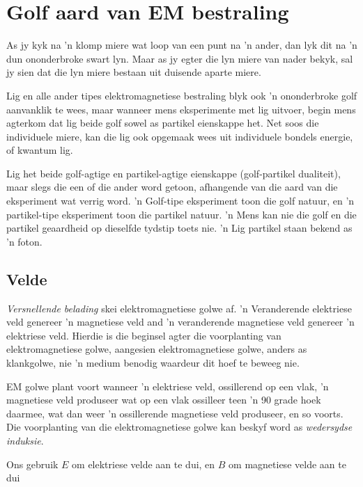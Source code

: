     \label{m38777*cid3}
            \section{Golf aard van EM bestraling}
            \nopagebreak
      \label{m38777*id186686}As jy kyk na 'n klomp miere wat loop van een punt na 'n ander, dan lyk dit na 'n dun ononderbroke swart lyn. Maar as jy egter die lyn miere van nader bekyk, sal jy sien dat die lyn miere bestaan uit duisende aparte miere.\par 
      \label{m38777*id187029}Lig en alle ander tipes elektromagnetiese bestraling blyk ook 'n ononderbroke golf aanvanklik te wees, maar wanneer mens eksperimente met lig uitvoer, begin mens agterkom dat lig beide golf sowel as partikel eienskappe het. Net soos die individuele miere, kan die lig ook opgemaak wees uit individuele bondels energie, of kwantum lig.\par 
      \label{m38777*id187035}Lig het beide golf-agtige en partikel-agtige eienskappe (golf-partikel dualiteit), maar slegs die een of die ander word getoon, afhangende van die aard van die eksperiment wat verrig word. 'n Golf-tipe eksperiment toon die golf natuur, en 'n partikel-tipe eksperiment toon die partikel natuur. 'n Mens kan nie die golf en die partikel geaardheid op dieselfde tydstip toets nie. 'n Lig partikel staan bekend as 'n foton.\par 







\subsection*{Velde}
            \nopagebreak
      \label{m38777*id187125}\textit{Versnellende belading} skei elektromagnetiese golwe af. 'n Veranderende elektriese veld genereer 'n magnetiese veld and 'n veranderende magnetiese veld genereer 'n elektriese veld. Hierdie is die beginsel agter die voorplanting van elektromagnetiese golwe, aangesien elektromagnetiese golwe, anders as klankgolwe, nie 'n medium benodig waardeur dit hoef te beweeg nie.  


EM golwe plant voort wanneer 'n elektriese veld, ossillerend op een vlak, 'n magnetiese veld produseer wat op een vlak ossilleer teen 'n 90 grade hoek daarmee, wat dan weer 'n ossillerende magnetiese veld produseer, en so voorts.   Die voorplanting van die elektromagnetiese golwe kan beskyf word as \textsl{wedersydse induksie}.\par Ons gebruik $E$ om elektriese velde aan te dui, en $B$ om magnetiese velde aan te dui\par


